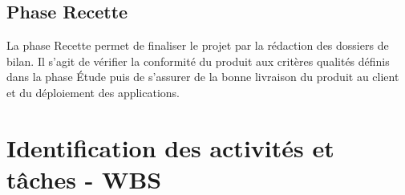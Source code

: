 \documentclass[a4paper]{article}
\begin{document}
        \subsection*{Phase Recette}

La phase Recette permet de finaliser le projet par la rédaction des dossiers de bilan. Il s'agit de vérifier la conformité du produit aux critères qualités définis dans la phase \'Etude puis de s'assurer de la bonne livraison du produit au client et du déploiement des applications.

	\newpage
	
	
	
	
	
	\vspace*{-50pt}
	\section{Identification des activités et tâches - WBS}
	
\end{document}
